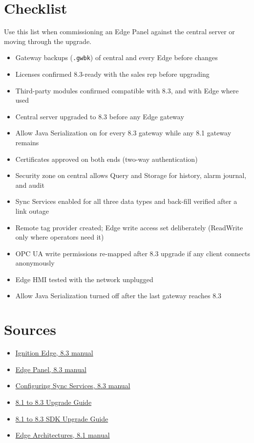 \section{Checklist}
Use this list when commissioning an Edge Panel against the central server or moving through the upgrade.
\begin{itemize}[itemsep=1pt, label=$\square$]
  \item Gateway backups (\texttt{.gwbk}) of central and every Edge before changes
  \item Licenses confirmed 8.3-ready with the sales rep before upgrading
  \item Third-party modules confirmed compatible with 8.3, and with Edge where used
  \item Central server upgraded to 8.3 before any Edge gateway
  \item Allow Java Serialization on for every 8.3 gateway while any 8.1 gateway remains
  \item Certificates approved on both ends (two-way authentication)
  \item Security zone on central allows Query and Storage for history, alarm journal, and audit
  \item Sync Services enabled for all three data types and back-fill verified after a link outage
  \item Remote tag provider created; Edge write access set deliberately (ReadWrite only where operators need it)
  \item OPC UA write permissions re-mapped after 8.3 upgrade if any client connects anonymously
  \item Edge HMI tested with the network unplugged
  \item Allow Java Serialization turned off after the last gateway reaches 8.3
\end{itemize}

\section*{Sources}
\begin{itemize}[itemsep=1pt]
  \item \href{https://docs.inductiveautomation.com/docs/8.3/other-editions/ignition-edge}{Ignition Edge, 8.3 manual}
  \item \href{https://docs.inductiveautomation.com/docs/8.3/other-editions/ignition-edge/edge-panel}{Edge Panel, 8.3 manual}
  \item \href{https://www.docs.inductiveautomation.com/docs/8.3/other-editions/ignition-edge/edge-gateway/configuring-sync-services}{Configuring Sync Services, 8.3 manual}
  \item \href{https://www.docs.inductiveautomation.com/docs/8.3/getting-started/installing-and-upgrading/ignition-8-upgrade-guide/81to83-upgrade-guide}{8.1 to 8.3 Upgrade Guide}
  \item \href{https://www.sdk-docs.inductiveautomation.com/docs/8.3/to-83-upgrade-guide/}{8.1 to 8.3 SDK Upgrade Guide}
  \item \href{https://www.docs.inductiveautomation.com/docs/8.1/system-architectures/edge-architectures}{Edge Architectures, 8.1 manual}
\end{itemize}
